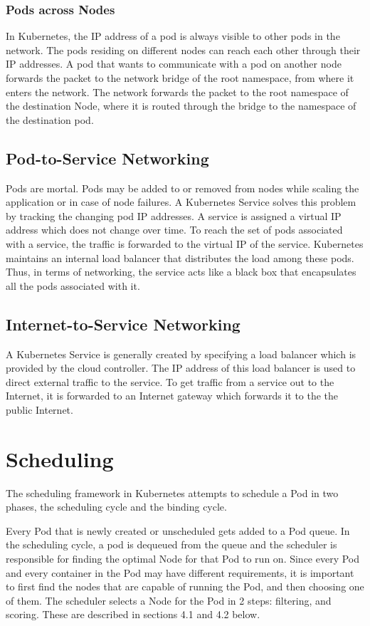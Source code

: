 \documentclass[sigconf]{acmart}
\begin{document}
\subsubsection{Pods across Nodes}
In Kubernetes, the IP address of a pod is always visible to other pods in the network. The pods residing on different nodes can reach each other through their IP addresses. A pod that wants to communicate with a pod on another node forwards the packet to the network bridge of the root namespace, from where it enters the network. The network forwards the packet to the root namespace of the destination Node, where it is routed through the bridge to the namespace of the destination pod.

\subsection{Pod-to-Service Networking}
Pods are mortal. Pods may be added to or removed from nodes while scaling the application or in case of node failures. A Kubernetes Service solves this problem by tracking the changing pod IP addresses. A service is assigned a virtual IP address which does not change over time. To reach the set of pods associated with a service, the traffic is forwarded to the virtual IP of the service. Kubernetes maintains an internal load balancer that distributes the load among these pods. Thus, in terms of networking, the service acts like a black box that encapsulates all the pods associated with it.

\subsection{Internet-to-Service Networking}
A Kubernetes Service is generally created by specifying a load balancer which is provided by the cloud controller. The IP address of this load balancer is used to direct external traffic to the service. To get traffic from a service out to the Internet, it is forwarded to an Internet gateway which forwards it to the the public Internet.

\section{Scheduling}

The scheduling framework in Kubernetes attempts to schedule a Pod in two phases, the scheduling cycle and the binding cycle. 

Every Pod that is newly created or unscheduled gets added to a Pod queue. In the scheduling cycle, a pod is dequeued from the queue and the scheduler is responsible for finding the optimal Node for that Pod to run on. Since every Pod and every container in the Pod may have different requirements, it is important to first find the nodes that are capable of running the Pod, and then choosing one of them. The scheduler selects a Node for the Pod in 2 steps: filtering, and scoring. These are described in sections 4.1 and 4.2 below.
\end{document}

